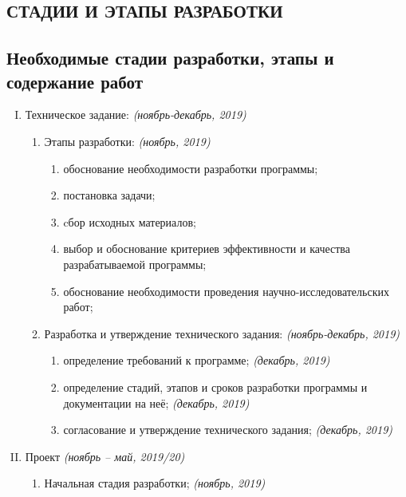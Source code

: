 \pagestyle{fancy}

\begin{center}
	\section{СТАДИИ И ЭТАПЫ РАЗРАБОТКИ}
\end{center}	
	
\subsection{Необходимые стадии разработки, этапы и содержание работ}

\begin{enumerate}[I.]
	\item Техническое задание: \textit{(ноябрь-декабрь, 2019)}
	\begin{enumerate}[1.]
		\item Этапы разработки: \textit{(ноябрь, 2019)}
		\begin{enumerate}[1.]
			\item обоснование необходимости разработки программы;
			\item постановка задачи;
			\item cбор исходных материалов;
			\item выбор и обоснование критериев эффективности и качества разрабатываемой программы;
			\item обоснование необходимости проведения научно-исследовательских работ;
		\end{enumerate}
	
		\item  Разработка и утверждение технического задания: \textit{(ноябрь-декабрь, 2019)}
		
		\begin{enumerate}[1.]
			\item определение требований к программе; \textit{(декабрь, 2019)}
			\item определение стадий, этапов и сроков разработки программы и документации на неё; \textit{(декабрь, 2019)}
			\item согласование и утверждение технического задания; \textit{(декабрь, 2019)}
		\end{enumerate}
	\end{enumerate}

	\item Проект \textit{(ноябрь – май, 2019/20)}
	
	\begin{enumerate}[1.]
		\item Начальная стадия разработки; \textit{(ноябрь, 2019)}
		

\end{enumerate}
\end{enumerate}
